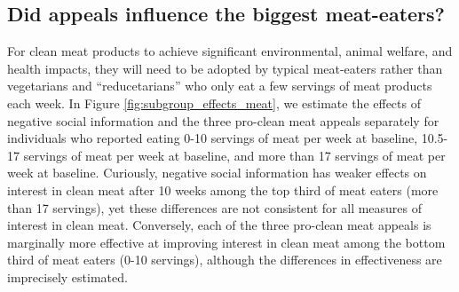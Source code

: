 \documentclass[12pt]{article}
\begin{document}




\subsection{Did appeals influence the biggest meat-eaters?} 

For clean meat products to achieve significant environmental, animal welfare, and health impacts, they will need to be adopted by typical meat-eaters rather than vegetarians and ``reducetarians'' who only eat a few servings of meat products each week. In Figure \ref{fig:subgroup_effects_meat}, we estimate the effects of negative social information and the three pro-clean meat appeals separately for individuals who reported eating 0-10 servings of meat per week at baseline, 10.5-17 servings of meat per week at baseline, and more than 17 servings of meat per week at baseline. Curiously, negative social information has weaker effects on interest in clean meat after 10 weeks among the top third of meat eaters (more than 17 servings), yet these differences are not consistent for all measures of interest in clean meat. Conversely, each of the three pro-clean meat appeals is marginally more effective at improving interest in clean meat among the bottom third of meat eaters (0-10 servings), although the differences in effectiveness are imprecisely estimated.
\end{document}
